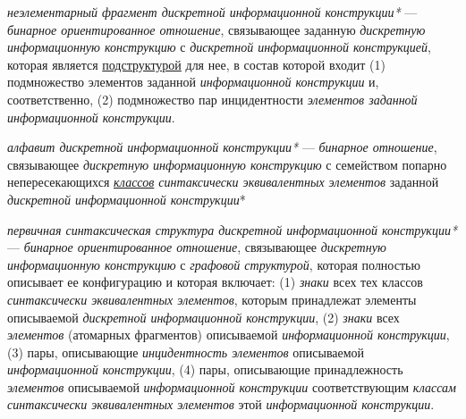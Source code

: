 \begin{SCn}


\end{SCn}

\textit{неэлементарный фрагмент дискретной информационной конструкции*} --- \textit{бинарное ориентированное отношение}, связывающее заданную \textit{дискретную информационную конструкцию} с \textit{дискретной информационной конструкцией}, которая является \underline{подструктурой} для нее, в состав которой входит (1) подмножество элементов заданной \textit{информационной конструкции} и, соответственно, (2) подмножество пар инцидентности \textit{элементов заданной информационной конструкции}.

\textit{алфавит дискретной информационной конструкции*} --- \textit{бинарное отношение}, связывающее \textit{дискретную информационную конструкцию} с семейством попарно непересекающихся \textit{\underline{классов} синтаксически эквивалентных элементов} заданной \textit{дискретной информационной конструкции}*

\textit{первичная синтаксическая структура дискретной информационной конструкции*} --- \textit{бинарное ориентированное отношение}, связывающее \textit{дискретную информационную конструкцию} с \textit{графовой структурой}, которая полностью описывает ее конфигурацию и которая включает: (1) \textit{знаки} всех тех классов \textit{синтаксически эквивалентных элементов}, которым принадлежат элементы описываемой \textit{дискретной информационной конструкции}, (2) \textit{знаки} всех \textit{элементов} (атомарных фрагментов) описываемой \textit{информационной конструкции}, (3) пары, описывающие \textit{инцидентность элементов} описываемой \textit{информационной конструкции}, (4) пары, описывающие принадлежность \textit{элементов} описываемой \textit{информационной конструкции} соответствующим \textit{классам синтаксически эквивалентных элементов} этой \textit{информационной конструкции}.

